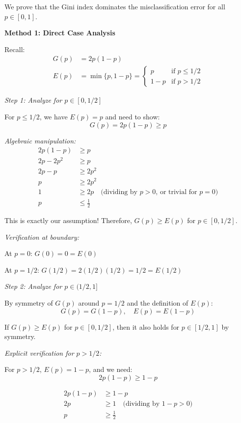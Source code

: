 \documentclass[12pt]{article}
\begin{document}
\begin{solution}
We prove that the Gini index dominates the misclassification error for all $p \in [0,1]$.

\textbf{Method 1: Direct Case Analysis}

Recall:
\begin{align*}
G(p) &= 2p(1-p) \\
E(p) &= \min\{p, 1-p\} = \begin{cases}
p & \text{if } p \leq 1/2 \\
1-p & \text{if } p > 1/2
\end{cases}
\end{align*}

\textit{Step 1: Analyze for $p \in [0, 1/2]$}

For $p \leq 1/2$, we have $E(p) = p$ and need to show:
\[
G(p) = 2p(1-p) \geq p
\]

\textit{Algebraic manipulation:}
\begin{align*}
2p(1-p) &\geq p \\
2p - 2p^2 &\geq p \\
2p - p &\geq 2p^2 \\
p &\geq 2p^2 \\
1 &\geq 2p \quad \text{(dividing by } p > 0\text{, or trivial for } p = 0\text{)} \\
p &\leq \frac{1}{2}
\end{align*}

This is exactly our assumption! Therefore, $G(p) \geq E(p)$ for $p \in [0, 1/2]$.

\textit{Verification at boundary:}

At $p = 0$: $G(0) = 0 = E(0)$

At $p = 1/2$: $G(1/2) = 2(1/2)(1/2) = 1/2 = E(1/2)$

\textit{Step 2: Analyze for $p \in (1/2, 1]$}

By symmetry of $G(p)$ around $p = 1/2$ and the definition of $E(p)$:
\[
G(p) = G(1-p), \quad E(p) = E(1-p)
\]

If $G(p) \geq E(p)$ for $p \in [0, 1/2]$, then it also holds for $p \in [1/2, 1]$ by symmetry.

\textit{Explicit verification for $p > 1/2$:}

For $p > 1/2$, $E(p) = 1-p$, and we need:
\[
2p(1-p) \geq 1-p
\]

\begin{align*}
2p(1-p) &\geq 1-p \\
2p &\geq 1 \quad \text{(dividing by } 1-p > 0\text{)} \\
p &\geq \frac{1}{2}
\end{align*}


\end{solution}
\end{document}
